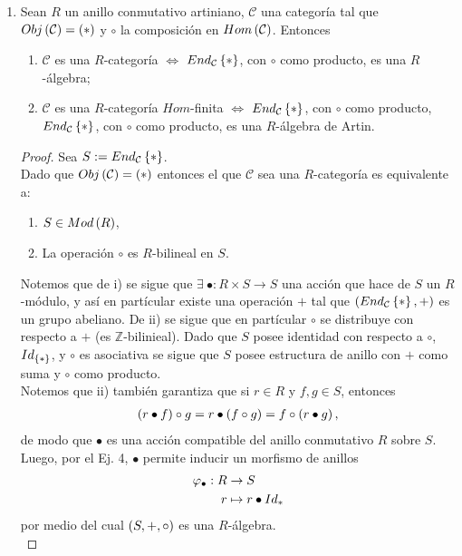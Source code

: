 \documentclass{article}
\begin{document}
\begin{enumerate}[label=\textbf{Ej \arabic*.}]
		\item Sean $R$ un anillo conmutativo artiniano, $\mathcal{C}$ una categoría tal que $Obj\left(\mathcal{C}\right)=\left(*\right)$ y $\circ$ la composición en $Hom\left(\mathcal{C}\right)$. Entonces
		\begin{enumerate}
			\item $\mathcal{C}$ es una $R$-categoría $\iff$ $End_{\mathcal{C}}\left\{*\right\}$, con $\circ$ como producto, es una $R$-álgebra;
			\item $\mathcal{C}$ es una $R$-categoría $Hom$-finita $\iff$ $End_{\mathcal{C}}\left\{*\right\}$, con $\circ$ como producto, $End_{\mathcal{C}}\left\{*\right\}$, con $\circ$ como producto, es una $R$-álgebra de Artin.
		\end{enumerate}
		\begin{proof}
			Sea $S:=End_{\mathcal{C}}\left\{*\right\}$.\\
			 Dado que $Obj\left(\mathcal{C}\right)=\left(*\right)$ entonces el que $\mathcal{C}$ sea una $R$-categoría es equivalente a:
			\begin{enumerate}[label=\roman*)]
				\item $S\in Mod\left(R\right)$,
				\item La operación $\circ$ es $R$-bilineal en $S$.
			\end{enumerate} 
			Notemos que de i) se sigue que $\exists\ \bullet:R\times S\to S$ una acción que hace de $S$ un $R$-módulo, y así en partícular existe una operación $+$ tal que $\left(End_{\mathcal{C}}\left\{*\right\},+\right)$ es un grupo abeliano. De ii) se sigue que en partícular $\circ$ se distribuye con respecto a $+$ (es $\mathbb{Z}$-bilinieal). Dado que $S$ posee identidad con respecto a $\circ$, $Id_{\left\{*\right\}}$, y $\circ$ es asociativa se sigue que $S$ posee estructura de anillo con $+$ como suma y $\circ$ como producto.\\
			Notemos que ii) también garantiza que si $r\in R$ y $f,g\in S$, entonces
			\begin{align*}
				\left(r\bullet f\right)\circ g=r\bullet\left(f\circ g\right)=f\circ\left(r\bullet g\right),
			\end{align*}
			de modo que $\bullet$ es una acción compatible del anillo conmutativo $R$ sobre $S$. Luego, por el Ej. 4, $\bullet$ permite inducir un morfismo de anillos 
			\begin{align*}
				\varphi_\bullet: R &\rightarrow S\\ r &\mapsto r\bullet Id_{*}
			\end{align*}
			 por medio del cual $\left(S,+,\circ\right)$ es una $R$-álgebra.\\

\end{proof}
\end{enumerate}
\end{document}
